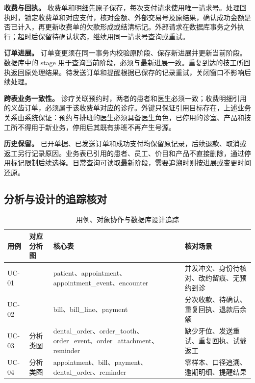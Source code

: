 \textbf{收费与回执。} 收费单和明细先原子保存，每次支付请求使用唯一请求号。处理回执时，锁定收费单和对应支付，核对金额、外部交易号及原结果，确认成功金额是否已计入，再更新收费单的欠款形成或结清标记。外部请求在数据库事务之外执行；超时后保留待确认状态，继续用同一请求号查询或重试。

\textbf{订单进展。} 订单变更须在同一事务内校验原阶段、保存新进展并更新当前阶段。数据库中的 stage 用于查询当前阶段，必须与最新进展一致。重复到达的技工所回执返回原处理结果。待发送订单和提醒根据已保存的记录重试，关闭窗口不影响后续处理。

\textbf{跨表业务一致性。} 诊疗关联预约时，两者的患者和医生必须一致；收费明细引用的义齿订单，必须属于该收费单对应的诊疗。外键只保证引用目标存在，上述业务关系由系统保证：预约与排班的医生必须具备医生角色，已停用的诊室、产品和技工所不得用于新业务，停用后其既有排班不再产生号源。

\textbf{历史保留。} 已开单据、已发送订单和成功支付均保留原记录，后续退款、取消或返工另行记录原因。业务表已引用的患者、员工、价目和产品不直接删除，通过停用标记限制后续选择。日常查询可读取最新阶段，需要追溯时则按进展或变更时间还原。

\subsection{分析与设计的追踪核对}
\begin{table}[H]\centering\caption{用例、对象协作与数据库设计追踪}
\small\begin{tabularx}{\textwidth}{L{1.3cm}L{4.2cm}L{4.1cm}Y}
\toprule 用例 & 对应分析图 & 核心表 & 核对场景\\\midrule
UC-01 &  & patient、appointment、appointment\_event、encounter & 并发冲突、身份待核对、改约留痕、无预约到诊\\
UC-02 &  & bill、bill\_line、payment & 分次收款、待确认、重复回执、退款后余额\\
UC-03 & 分析类图  & dental\_order、order\_tooth、order\_event、order\_attachment、reminder & 缺少牙位、发送重试、重复回执、试戴返工\\
UC-04 & 分析类图  & appointment、bill、payment、dental\_order、reminder & 零样本、口径追溯、逾期明细、提醒结果\\
\bottomrule\end{tabularx}\end{table}

